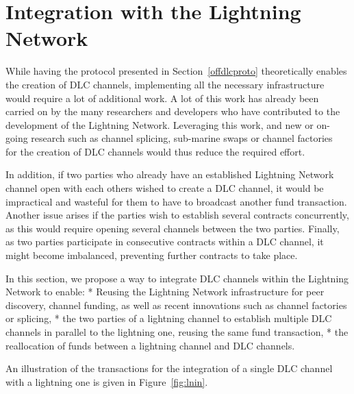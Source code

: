 
\section{Integration with the Lightning Network}\label{lninte}

While having the protocol presented in Section~\ref{offdlcproto} theoretically enables the creation of DLC channels, implementing all the necessary infrastructure would require a lot of additional work.
A lot of this work has already been carried on by the many researchers and developers who have contributed to the development of the Lightning Network.
Leveraging this work, and new or on-going research such as channel splicing, sub-marine swaps or channel factories~\cite{burchert2018scalable} for the creation of DLC channels would thus reduce the required effort.

In addition, if two parties who already have an established Lightning Network channel open with each others wished to create a DLC channel, it would be impractical and wasteful for them to have to broadcast another fund transaction.
Another issue arises if the parties wish to establish several contracts concurrently, as this would require opening several channels between the two parties.
Finally, as two parties participate in consecutive contracts within a DLC channel, it might become imbalanced, preventing further contracts to take place.

In this section, we propose a way to integrate DLC channels within the Lightning Network to enable:
* Reusing the Lightning Network infrastructure for peer discovery, channel funding, as well as recent innovations such as channel factories or splicing,
* the two parties of a lightning channel to establish multiple DLC channels in parallel to the lightning one, reusing the same fund transaction,
* the reallocation of funds between a lightning channel and DLC channels.

An illustration of the transactions for the integration of a single DLC channel with a lightning one is given in Figure~\ref{fig:lnin}.

